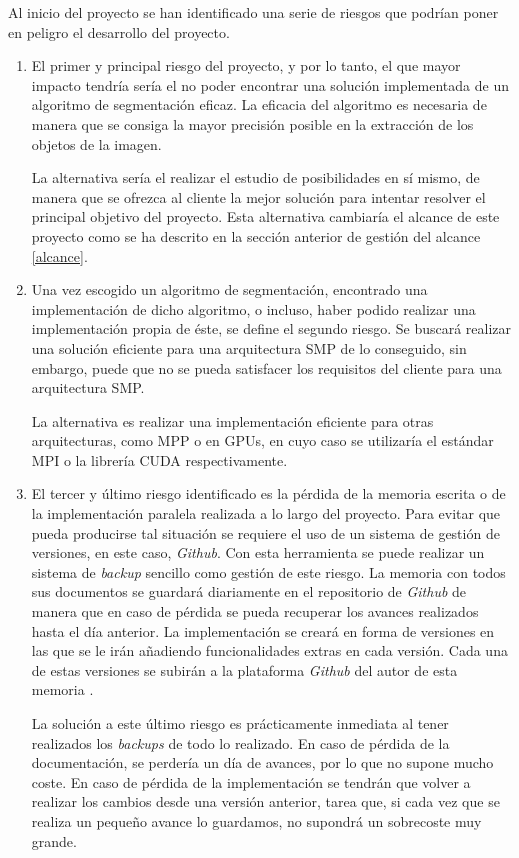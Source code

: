 Al inicio del proyecto se han identificado una serie de riesgos que podr\'{i}an poner en peligro el desarrollo del proyecto.

\begin{enumerate}
	\item El primer y principal riesgo del proyecto, y por lo tanto, el que mayor impacto tendr\'{i}a ser\'{i}a el no poder encontrar una soluci\'{o}n implementada de un algoritmo de segmentaci\'{o}n eficaz. La eficacia del algoritmo es necesaria de manera que se consiga la mayor precisi\'{o}n posible en la extracci\'{o}n de los objetos de la imagen.
	
	La alternativa ser\'{i}a el realizar el estudio de posibilidades en s\'{i} mismo, de manera que se ofrezca al cliente la mejor soluci\'{o}n para intentar resolver el principal objetivo del proyecto. Esta alternativa cambiar\'{i}a el alcance de este proyecto como se ha descrito en la secci\'{o}n anterior de gesti\'{o}n del alcance \ref{alcance}.
	
	\item Una vez escogido un algoritmo de segmentaci\'{o}n, encontrado una implementaci\'{o}n de dicho algoritmo, o incluso, haber podido realizar una implementaci\'{o}n propia de \'{e}ste, se define el segundo riesgo. Se buscar\'{a} realizar una soluci\'{o}n eficiente para una arquitectura SMP de lo conseguido, sin embargo, puede que no se pueda satisfacer los requisitos del cliente para una arquitectura SMP.
	
	La alternativa es realizar una implementaci\'{o}n eficiente para otras arquitecturas, como MPP o en GPUs, en cuyo caso se utilizar\'{i}a el est\'{a}ndar MPI o la librer\'{i}a CUDA respectivamente.
	
	\item El tercer y \'{u}ltimo riesgo identificado es la p\'{e}rdida de la memoria escrita o de la implementaci\'{o}n paralela realizada a lo largo del proyecto. Para evitar que pueda producirse tal situaci\'{o}n se requiere el uso de un sistema de gesti\'{o}n de versiones, en este caso, \textit{Github}. Con esta herramienta se puede realizar un sistema de \textit{backup} sencillo como gesti\'{o}n de este riesgo. La memoria con todos sus documentos se guardar\'{a} diariamente en el repositorio de \textit{Github} de manera que en caso de p\'{e}rdida se pueda recuperar los avances realizados hasta el d\'{i}a anterior. La implementaci\'{o}n se crear\'{a} en forma de versiones en las que se le ir\'{a}n a\~{n}adiendo funcionalidades extras en cada versi\'{o}n. Cada una de estas versiones se subir\'{a}n a la plataforma \textit{Github} del autor de esta memoria \cite{gitHub1}. 
	
	La soluci\'{o}n a este \'{u}ltimo riesgo es pr\'{a}cticamente inmediata al tener realizados los \textit{backups} de todo lo realizado. En caso de p\'{e}rdida de la documentaci\'{o}n, se perder\'{i}a un d\'{i}a de avances, por lo que no supone mucho coste. En caso de p\'{e}rdida de la implementaci\'{o}n se tendr\'{a}n que volver a realizar los cambios desde una versi\'{o}n anterior, tarea que, si cada vez que se realiza un peque\~{n}o avance lo guardamos, no supondr\'{a} un sobrecoste muy grande.
	
\end{enumerate}
